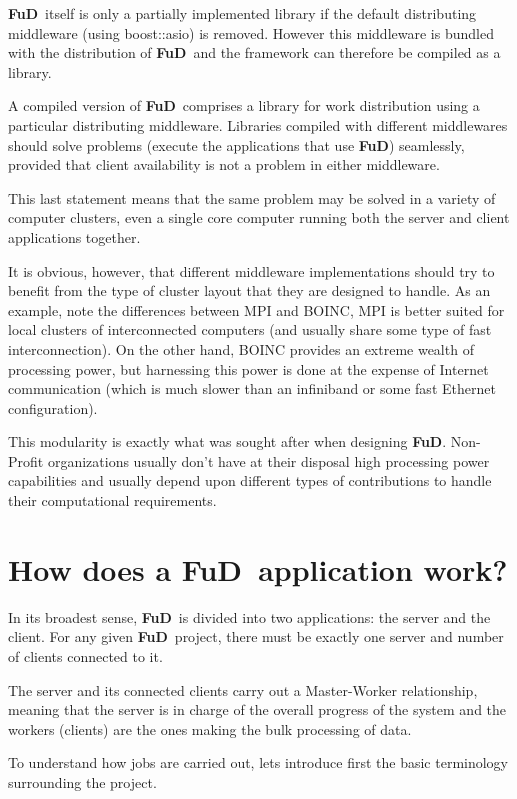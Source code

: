 \documentclass[a4paper,12pt,english]{report}
\newcommand{\fud}{\textbf{FuD}}
\begin{document}
\fud \ itself is only a partially implemented library if the default distributing middleware (using boost::asio) is removed. However this middleware is bundled with the distribution of \fud \ and the framework can therefore be compiled as a library.

A compiled version of \fud \ comprises a library for work distribution using a particular distributing middleware. Libraries compiled with different middlewares should solve problems (execute the applications that use \fud) seamlessly, provided that client availability is not a problem in either middleware.

This last statement means that the same problem may be solved in a variety of computer clusters, even a single core computer running both the server and client applications together.

It is obvious, however, that different middleware implementations should try to benefit from the type of cluster layout that they are designed to handle. As an example, note the differences between MPI and BOINC, MPI is better suited for local clusters of interconnected computers (and usually share some type of fast interconnection). On the other hand, BOINC provides an extreme wealth of processing power\cite{boinc2}, but harnessing this power is done at the expense of Internet communication (which is much slower than an infiniband or some fast Ethernet configuration).

This modularity is exactly what was sought after when designing \fud. Non-Profit organizations usually don't have at their disposal high processing power capabilities and usually depend upon different types of contributions to handle their computational requirements.

\section{How does a \fud \ application work?}

In its broadest sense, \fud \ is divided into two applications: the server and the client. For any given \fud \ project, there must be exactly one server and number of clients connected to it. 

The server and its connected clients carry out a Master-Worker relationship, meaning that the server is in charge of the overall progress of the system and the workers (clients) are the ones making the bulk processing of data.

To understand how jobs are carried out, lets introduce first the basic terminology surrounding the project.
\end{document}
